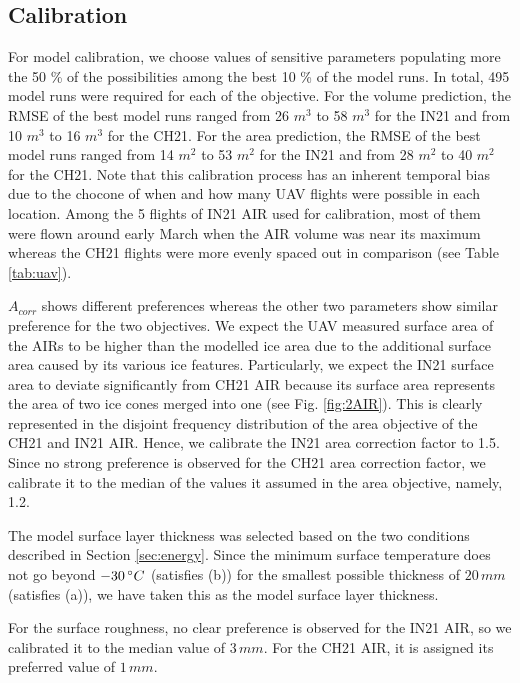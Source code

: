 \documentclass[utf8]{frontiersSCNS} %
\begin{document}
\subsection{Calibration}

For model calibration, we choose values of sensitive parameters populating more the 50 \% of the possibilities
among the best 10 \% of the model runs. In total, 495 model runs were required for each of the objective.
For the volume prediction, the RMSE of the best model runs ranged from 26 $m^3$ to 58 $m^3$ for the IN21 and from
10 $m^3$ to 16 $m^3$ for the CH21. For the area prediction, the RMSE of the best model runs ranged from 14 $m^2$ to
53 $m^2$ for the IN21 and from 28 $m^2$ to 40 $m^2$ for the CH21. Note that this calibration process has an
inherent temporal bias due to the chocone of when and how many UAV flights were possible in each location. Among
the 5 flights of IN21 AIR used for calibration, most of them were flown around early March when the AIR volume was
near its maximum whereas the CH21 flights were more evenly spaced out in comparison (see Table \ref{tab:uav}).

$A_{corr}$ shows different preferences whereas the other two parameters show similar preference for the two
objectives. We expect the UAV measured surface area of the AIRs to be higher than the modelled ice area due to the
additional surface area caused by its various ice features. Particularly, we expect the IN21 surface area to
deviate significantly from CH21 AIR because its surface area represents the area of two ice cones merged into one
(see Fig.  \ref{fig:2AIR}). This is clearly represented in the disjoint frequency distribution of the area
objective of the CH21 and IN21 AIR. Hence, we calibrate the IN21 area correction factor to 1.5. Since no strong
preference is observed for the CH21 area correction factor, we calibrate it to the median of the values it assumed
in the area objective, namely, 1.2.

The model surface layer thickness was selected based on the two conditions described in Section \ref{sec:energy}.
Since the minimum surface temperature does not go beyond $-30 \, \degree C$ (satisfies (b)) for the smallest
possible thickness of $20\, mm$ (satisfies (a)), we have taken this as the model surface layer thickness.

For the surface roughness, no clear preference is observed for the IN21 AIR, so we calibrated it to the median
value of $3 \, mm$. For the CH21 AIR, it is assigned its preferred value of $1 \, mm$.
\end{document}
